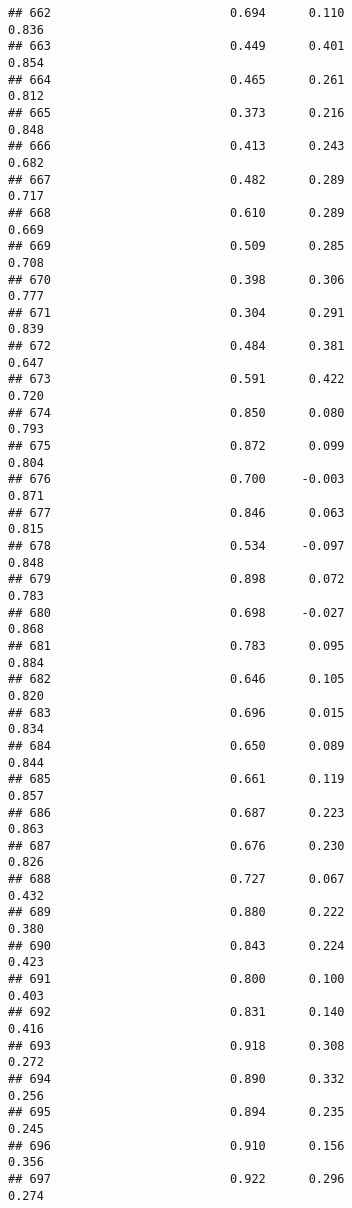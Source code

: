 \documentclass[
]{article}
\begin{document}
\begin{verbatim}
## 662                         0.694      0.110                     0.836
## 663                         0.449      0.401                     0.854
## 664                         0.465      0.261                     0.812
## 665                         0.373      0.216                     0.848
## 666                         0.413      0.243                     0.682
## 667                         0.482      0.289                     0.717
## 668                         0.610      0.289                     0.669
## 669                         0.509      0.285                     0.708
## 670                         0.398      0.306                     0.777
## 671                         0.304      0.291                     0.839
## 672                         0.484      0.381                     0.647
## 673                         0.591      0.422                     0.720
## 674                         0.850      0.080                     0.793
## 675                         0.872      0.099                     0.804
## 676                         0.700     -0.003                     0.871
## 677                         0.846      0.063                     0.815
## 678                         0.534     -0.097                     0.848
## 679                         0.898      0.072                     0.783
## 680                         0.698     -0.027                     0.868
## 681                         0.783      0.095                     0.884
## 682                         0.646      0.105                     0.820
## 683                         0.696      0.015                     0.834
## 684                         0.650      0.089                     0.844
## 685                         0.661      0.119                     0.857
## 686                         0.687      0.223                     0.863
## 687                         0.676      0.230                     0.826
## 688                         0.727      0.067                     0.432
## 689                         0.880      0.222                     0.380
## 690                         0.843      0.224                     0.423
## 691                         0.800      0.100                     0.403
## 692                         0.831      0.140                     0.416
## 693                         0.918      0.308                     0.272
## 694                         0.890      0.332                     0.256
## 695                         0.894      0.235                     0.245
## 696                         0.910      0.156                     0.356
## 697                         0.922      0.296                     0.274

\end{verbatim}
\end{document}

